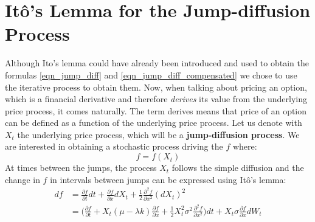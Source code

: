 \documentclass[times, utf8, diplomski]{fer}
\begin{document}
\section{It\^{o}'s Lemma for the Jump-diffusion Process}
Although Ito's lemma could have already been introduced and used to obtain the formulas \ref{eqn_jump_diff} and \ref{eqn_jump_diff_compensated} we chose to use the iterative process to obtain them. Now, when talking about pricing an option, which is a financial derivative and therefore \textit{derives} its value from the underlying price process, it comes naturally. The term derives means that price of an option can be defined as a function of the underlying price process. Let us denote with $X_t$ the underlying price process, which will be a \textbf{jump-diffusion process}. We are interested in obtaining a stochastic process driving the $f$ where: $$ f = f(X_t) $$
At times between the jumps, the process $X_t$ follows the simple diffusion and the change in $f$ in intervals between jumps can be expressed using It\^{o}'s lemma: 
\begin{equation} \label{eqn_diff_part}
\begin{split}
	df &= \frac{\partial f}{\partial t}dt + \frac{\partial f}{\partial x}dX_t + \frac{1}{2}\frac{\partial^2f}{\partial x^2}(dX_t)^2 \\
	   &= \bigg(\frac{\partial f}{\partial t} + X_t(\mu - \lambda k)\frac{\partial f}{\partial x} + \frac{1}{2}X_t^2\sigma^2\frac{\partial^2 f}{\partial x^2}\bigg)dt + X_t\sigma\frac{\partial f}{\partial x}dW_t
\end{split}
\end{equation}
\end{document}
